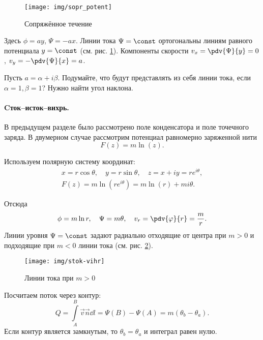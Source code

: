 \begin{figure}[ht!]
    \centering
    \texttt{[image: img/sopr\_potent]}
    \caption{Сопряжённое течение}
    \label{fig:coj}
\end{figure}
Здесь $\phi=ay$, $\Psi=-ax$. Линии тока $\Psi=\const$ ортогональны линиям равного потенциала $y=\const$ (см. рис. \ref{fig:coj}). Компоненты скорости $v_x=\pdv{\Psi}{y}=0$, $v_y=-\pdv{\Psi}{x}=a$.

Пусть $a=\alpha + i\beta$. Подумайте, что будут представлять из себя линии тока, если $\alpha=1,\beta=1$? Нужно найти угол наклона.

\paragraph{Cток--исток--вихрь.} В предыдущем разделе было рассмотрено поле конденсатора и поле точечного заряда. В двумерном случае рассмотрим потенциал равномерно заряженной нити
\begin{equation}
	F(z)=m\ln(z).
\end{equation}
\begin{comment}
     |y
   ______*
  /     /\
 /     /  \
/     / t  \
-----*--------->x
\          /
 \        /
  \______/
\end{comment}
Используем полярную систему координат:
\begin{equation}
\begin{aligned}
	\label{eqss}
	x=r\cos\theta,\quad y=r\sin\theta, \quad z=x+iy=re^{i\theta},\\
	F(z)=m\ln(re^{i\theta})=m\ln(r)+mi\theta.
\end{aligned}
\end{equation}

\begin{comment}
Принцип действия логарифмической линейки
 ______________________________________
|_.__.__.___.___.____._____.____.______| ln x
	 ______________________________________
	|_.__.__.___.___.____._____.____.______| шкала произведения
 ______________________________________
|_.__.__.___.___.____._____.____.______| ln y

x*y
x+y

lnx+lny=ln(xy)
\end{comment}
Отсюда
\begin{equation}
	\phi=m\ln{r}, \quad \Psi=m\theta, \quad v_r=\pdv{\varphi}{r}=\frac{m}{r}.
\end{equation}
Линии уровня $\Psi=\const$ задают радиально отходящие от центра при $m>0$ и подходящие при $m<0$ линии тока (см. рис. \ref{fig:tok_lines}).
\begin{figure}[H]
    \centering
    \texttt{[image: img/stok-vihr]}
    \caption{Линии тока при $m>0$}
    \label{fig:tok_lines}
\end{figure}
Посчитаем поток через контур:
\begin{equation}
	Q=\int\limits_{A}^{B} \vec{v}\vec{n}\dd{l}=\Psi(B)-\Psi(A)=m(\theta_b-\theta_a).
\end{equation}
Если контур является замкнутым, то $\theta_b=\theta_a$ и интеграл равен нулю.

